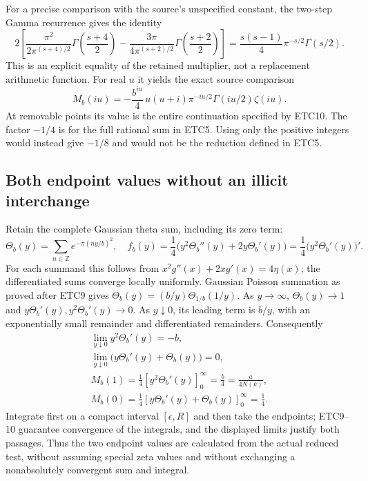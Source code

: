 For a precise comparison with the source's unspecified constant,
the two-step Gamma recurrence gives the identity
\begin{equation}\tag{ETC12}
 2\left[
     \frac{\pi^2}{2\pi^{(s+4)/2}}\Gamma\left(\frac{s+4}{2}\right)
    -\frac{3\pi}{4\pi^{(s+2)/2}}\Gamma\left(\frac{s+2}{2}\right)
 \right]
 =\frac{s(s-1)}4\pi^{-s/2}\Gamma(s/2).
\end{equation}
This is an explicit equality of the retained multiplier, not a
replacement arithmetic function. For real $u$ it yields the exact
source comparison
\begin{equation}\tag{ETC13}
 M_b(iu)=-\frac{b^{iu}}4\,u(u+i)
                   \pi^{-iu/2}\Gamma(iu/2)\zeta(iu).
\end{equation}
At removable points its value is the entire continuation specified
by ETC10. The factor $-1/4$ is for the full rational sum in ETC5.
Using only the positive integers would instead give $-1/8$ and
would not be the reduction defined in ETC5.

\subsection{Both endpoint values without an illicit interchange}

Retain the complete Gaussian theta sum, including its zero term:
\begin{equation}\tag{ETC14}
 \Theta_b(y)=\sum_{n\in\mathbb Z}e^{-\pi(ny/b)^2},\quad
 f_b(y)=\frac14\bigl(y^2\Theta_b''(y)+2y\Theta_b'(y)\bigr)
       =\frac14\bigl(y^2\Theta_b'(y)\bigr)'.
\end{equation}
For each summand this follows from
$x^2g''(x)+2xg'(x)=4\eta(x)$; the differentiated sums converge
locally uniformly. Gaussian Poisson summation as proved after ETC9
gives
$\Theta_b(y)=(b/y)\Theta_{1/b}(1/y)$.
As $y\to\infty$, $\Theta_b(y)\to1$ and
$y\Theta_b'(y),y^2\Theta_b'(y)\to0$.
As $y\downarrow0$, its leading term is $b/y$, with an
exponentially small remainder and differentiated remainders.
Consequently
\begin{equation}\tag{ETC15}
 \begin{gathered}
 \lim_{y\downarrow0}y^2\Theta_b'(y)=-b,\\
 \lim_{y\downarrow0}\bigl(y\Theta_b'(y)+\Theta_b(y)\bigr)=0,\\
 M_b(1)=\frac14[y^2\Theta_b'(y)]_{0}^{\infty}
       =\frac b4=\frac{a}{4N(k)},\\
 M_b(0)=\frac14[y\Theta_b'(y)+\Theta_b(y)]_{0}^{\infty}
       =\frac14.
 \end{gathered}
\end{equation}
Integrate first on a compact interval $[\epsilon,R]$ and then
take the endpoints; ETC9--10 guarantee convergence of the integrals,
and the displayed limits justify both passages. Thus the two endpoint
values are calculated from the actual reduced test, without assuming
special zeta values and without exchanging a nonabsolutely convergent
sum and integral.

